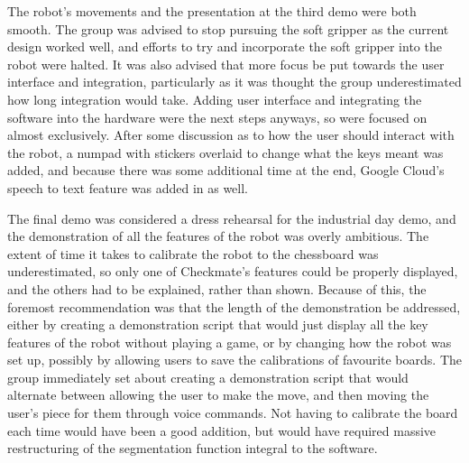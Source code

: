 \documentclass[onecolumn]{IEEEtran}
\begin{document}
The robot's movements and the presentation at the third demo were both smooth. The group was advised to stop pursuing the soft gripper as the current design worked well, and efforts to try and incorporate the soft gripper into the robot were halted. It was also advised that more focus be put towards the user interface and integration, particularly as it was thought the group underestimated how long integration would take. Adding user interface and integrating the software into the hardware were the next steps anyways, so were focused on almost exclusively. After some discussion as to how the user should interact with the robot, a numpad with stickers overlaid to change what the keys meant was added, and because there was some additional time at the end, Google Cloud's speech to text feature was added in as well.\par
The final demo was considered a dress rehearsal for the industrial day demo, and the demonstration of all the features of the robot was overly ambitious. The extent of time it takes to calibrate the robot to the chessboard was underestimated, so only one of Checkmate's features could be properly displayed, and the others had to be explained, rather than shown. Because of this, the foremost recommendation was that the length of the demonstration be addressed, either by creating a demonstration script that would just display all the key features of the robot without playing a game, or by changing how the robot was set up, possibly by allowing users to save the calibrations of favourite boards. The group immediately set about creating a demonstration script that would alternate between allowing the user to make the move, and then moving the user's piece for them through voice commands. Not having to calibrate the board each time would have been a good addition, but would have required massive restructuring of the segmentation function integral to the software.\par
\end{document}
